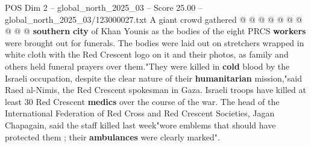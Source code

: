 \begin{textsample}{POS Dim 2 – global\_north\_2025\_03 – Score 25.00 – global\_north\_2025\_03/123000027.txt}
A giant crowd gathered @ @ @ @ @ @ @ @ @ @ \textbf{southern} \textbf{city} of Khan Younis as the bodies of the eight PRCS \textbf{workers} were brought out for funerals.
The bodies were laid out on stretchers wrapped in white cloth with the Red Crescent logo on it and their photos, as family and others held funeral prayers over them."They were killed in \textbf{cold} blood by the Israeli occupation, despite the clear nature of their \textbf{humanitarian} mission,"said Raed al-Nimis, the Red Crescent spokesman in Gaza.
Israeli troops have killed at least 30 Red Crescent \textbf{medics} over the course of the war.
The head of the International Federation of Red Cross and Red Crescent Societies, Jagan Chapagain, said the staff killed last week"wore emblems that should have protected them ; their \textbf{ambulances} were clearly marked".

\end{textsample}
